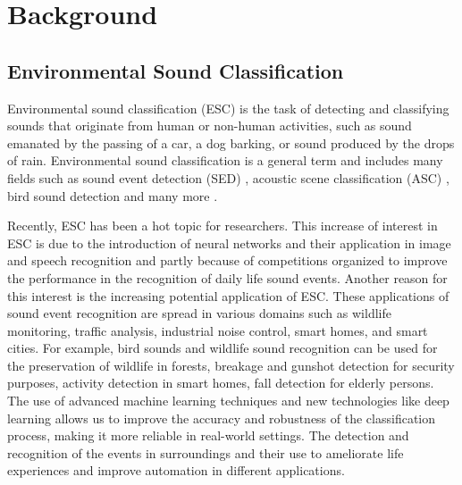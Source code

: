 
\chapter[Background]{Background}
\label{chapter:backround}
\section{Environmental Sound Classification}
\label{chapter:backroundIntroESC}
Environmental sound classification (ESC) is the task of detecting and classifying sounds that originate from  human or non-human activities, such as sound emanated by the passing of a car, a dog barking, or sound produced by the drops of rain. Environmental sound classification is a general term and includes many fields such as sound event detection (SED) \cite{mesaros2021sound, heittola2013context}, acoustic scene classification (ASC) \cite{abesser2020review, mesaros2016tut}, bird sound detection \cite{kahl2017large, adavanne2017stacked} and many more \cite{turpault2020improving, lavner2016baby, pandeya2018domestic, salamon2015unsupervised, piczak2015environmental}. 

Recently, ESC has been a hot topic for researchers. This increase of interest in ESC is due to the introduction of neural networks and their application in image and speech recognition \cite{choi2016dnn, perez2017effectiveness, deng2013new} and partly because of competitions organized \cite{mesaros2017dcase, mesaros2019sound, mesaros2017detection, BOJER2020} to improve the performance in the recognition of daily life sound events. Another reason for this interest is the increasing potential application of ESC. These applications of sound event recognition are spread in various domains  such as wildlife monitoring, traffic analysis, industrial noise control, smart homes, and smart cities. For example, bird sounds and wildlife sound recognition \cite{stowell2016bird} can be used for the preservation of wildlife in forests, breakage and gunshot detection \cite{lim2017rare} for security purposes, activity detection in smart homes, fall detection for elderly persons\cite{adnan2018fall}. The use of advanced machine learning techniques and new technologies like deep learning allows us to improve the accuracy and robustness of the classification process, making it more reliable in real-world settings. The detection and recognition of the events in surroundings and their use to ameliorate life experiences and improve automation in different applications.

